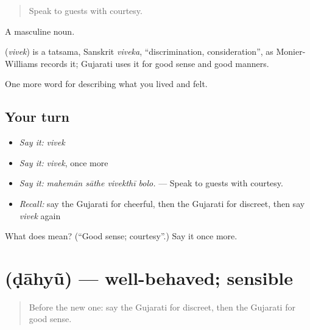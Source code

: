 \begin{quote}
Speak to guests with courtesy.
\end{quote}

A masculine noun.

\begin{cousinweb}
\textbf{} (\emph{vivek}) is a tatsama, Sanskrit \emph{viveka}, \textquotedblleft{}discrimination, consideration\textquotedblright{}, as Monier-Williams records it; Gujarati uses it for good sense and good manners.
\end{cousinweb}

\begin{grammarlens}[title={What you've built}]
One more word for describing what you lived and felt.
\end{grammarlens}

\subsection*{Your turn}
\begin{itemize}
\raggedright
  \item \emph{Say it:} \emph{vivek}
  \item \emph{Say it:} \emph{vivek}, once more
  \item \emph{Say it:} \emph{mahemān sāthe vivekthī bolo.} — Speak to guests with courtesy.
  \item \emph{Recall:} say the Gujarati for cheerful, then the Gujarati for discreet, then say \emph{vivek} again
\end{itemize}

\begin{tcolorbox}[breakable,colback=teal!4,colframe=teal!35!black,title={Before you move on}]
What does  mean? (\textquotedblleft{}Good sense; courtesy\textquotedblright{}.) Say it once more.
\end{tcolorbox}
\section[\texorpdfstring{\gu{ડાહ્યું} (ḍāhyũ)}{ડાહ્યું (ḍāhyũ)}]{ (ḍāhyũ) — well-behaved; sensible}

\label{lesson:GU-C464-dahyu}



\begin{quote}
Before the new one: say the Gujarati for discreet, then the Gujarati for good sense.
\end{quote}

